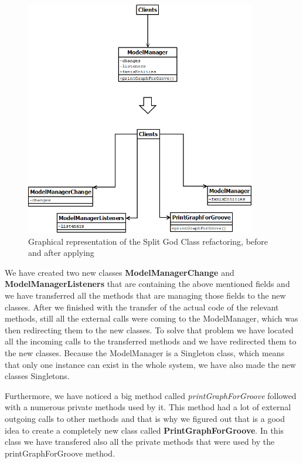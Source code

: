\documentclass{article}
\begin{document}
\begin{figure}[h]
\centering
\includegraphics[width=0.9\textwidth]{Images/GodClassSplit}
\caption{Graphical representation of the Split God Class refactoring, before and after applying}
\label{fig:GodClassSplit}
\end{figure}

We have created two new classes \textbf{ModelManagerChange} and \textbf{ModelManagerListeners} that are containing the above mentioned fields and we have transferred all the methods that are managing those fields to the new classes. After we finished with the transfer of the actual code of the relevant methods, still all the external calls were coming to the ModelManager, which was then redirecting them to the new classes. To solve that problem we have located all the incoming calls to the transferred methods and we have redirected them to the new classes. Because the ModelManager is a Singleton class, which means that only one instance can exist in the whole system, we have also made the new classes Singletons.

Furthermore, we have noticed a big method called \emph{printGraphForGroove} followed with a numerous private methods used by it. This method had a lot of external outgoing calls to other methods and that is why we figured out that is a good idea to create a completely new class called \textbf{PrintGraphForGroove}. In this class we have transfered also all the private methods that were used by the printGraphForGroove method.
\end{document}
